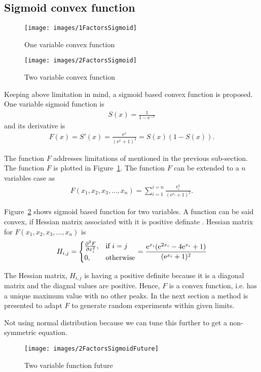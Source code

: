 \documentclass[twocolumn]{svjour3}          %
\newcommand{\me}{\mathrm{e}}
\begin{document}
	\subsection{Sigmoid convex function}
	\begin{figure}
		\centering
		\texttt{[image: images/1FactorsSigmoid]}
		\label{Fig:OneVarSigmoid}
		\caption{One variable convex function}
	\end{figure}
	\begin{figure}
		\centering
		\texttt{[image: images/2FactorsSigmoid]}
		\label{Fig:MultiVarSigmoid}
		\caption{Two variable convex function}
	\end{figure}
	Keeping above limitation in mind, a sigmoid based convex function is proposed. One variable sigmoid function is
	\begin{eqnarray}
	S(x) = \frac{1}{1-\me^{-x}} \label{Eqn:Sigmoid}
	\end{eqnarray}
	and its derivative is
	\begin{eqnarray}
	F(x) = S'(x) = \frac{\me^x}{(\me^{x}+1)^2} = S(x)(1-S(x)). \label{Eqn:DiffSigmoid}
	\end{eqnarray}
	\par
	The function $F$ addresses limitations of mentioned in the previous sub-section. The function $F$ is plotted in Figure~\ref{Fig:OneVarSigmoid}. The function $F$ can be extended to a $n$ variables case as
	\begin{eqnarray}
	F(x_1, x_2, x_3, ..., x_n) = \sum_{i=1}^{i=n}{\frac{\me^x_i}{(\me^{x_i}+1)^2}}. \label{Eqn:DiffSigmoidMulti}
	\end{eqnarray}
	\par
	Figure~\ref{Fig:MultiVarSigmoid} shows sigmoid based function for two variables. A function can be said convex, if Hessian matrix associated with it is positive definate \cite{bernstein1962some}. Hessian matrix for $F(x_1, x_2, x_3, ..., x_n)$ is 
	\begin{eqnarray}
	H_{i,j} = 
	\begin{cases}
	\pdv[2]{F}{x_i},& \text{if } i = j\\
	0,              & \text{otherwise}
	\end{cases}
	= \frac{\me^{x_i}(\me^{2x_i}-4\me^{x_i}+1)}{(\me^{x_i}+1)^2} \label{Eqn:HessianMatrix}
	\end{eqnarray}
	\par
	The Hessian matrix, $H_{i,j}$ is having a positive definite because it is a diagonal matrix and the diagnal values are positive. Hence, $F$ is a convex function, i.e. has a unique maximum value with no other peaks. In the next section a method is presented to adapt $F$ to generate random experiments within given limits.
	\par
	Not using normal distribution because we can tune this further to get a non-symmetric equation.
	\begin{figure}
		\centering
		\texttt{[image: images/2FactorsSigmoidFuture]}
		\label{Fig:TwoVarFutureFunc}
		\caption{Two variable function future}
	\end{figure}
\end{document}
